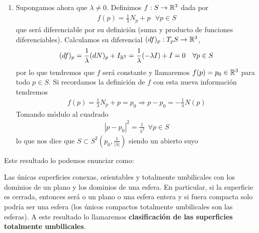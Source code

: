 \begin{ejercicio}
\begin{enumerate}
\begin{enumerate}
            \item Supongamos ahora que $\lambda \neq 0$. Definimos $f:S\to \mathbb{R}^3$ dada por 
            \begin{gather*}
                f(p) = \frac{1}{\lambda}N_p + p\ \ \ \forall p \in S
            \end{gather*}
            que será diferenciable por su definición (suma y producto de funciones diferenciables). Calculamos su diferencial $(df)_p : T_pS \to \mathbb{R}^3$, 
            \begin{gather*}
                (df)_p = \frac{1}{\lambda}(dN)_p + I_{\mathbb{R}^3} = \frac{1}{\lambda}(-\lambda I) + I = 0\ \ \ \forall p \in S
            \end{gather*}
            por lo que tendremos que $f$ será constante y llamaremos $f(p)=p_0\in \mathbb{R}^3$ para todo $p\in S$. Si recordamos la definición de $f$ con esta nueva información tendremos
            \begin{gather*}
                f(p) = \frac{1}{\lambda}N_p + p = p_0 \Rightarrow p - p_0 = - \frac{1}{\lambda} N(p)
            \end{gather*}
            Tomando módulo al cuadrado
            \begin{gather*}
                | p - p_0 |^2 = \frac{1}{\lambda^2} \ \ \forall p \in S
            \end{gather*}
            lo que nos dice que $S\subset S^2(p_0, \frac{1}{|\lambda|})$ siendo un abierto suyo
        \end{enumerate}
        Este resultado lo podemos enunciar como:

        Las únicas superficies conexas, orientables y totalmente umbilicales con los dominios de un plano y los dominios de una esfera. En particular, si la superficie es cerrada, entonces será o un plano o una esfera entera y si fuera compacta solo podría ser una esfera (los únicos compactos totalmente umbilicales son las esferas). A este resultado lo llamaremos \textbf{clasificación de las superficies totalmente umbilicales}.


\end{enumerate}
\end{ejercicio}

